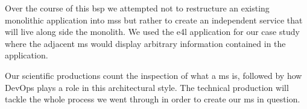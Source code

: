 Over the course of this \gls{bsp} we attempted not to restructure an
existing monolithic application into \glspl{ms} but rather to create
an independent service that will live along side the monolith. We used
the \gls{e4l} application for our case study where the adjacent
\gls{ms} would display arbitrary information contained in the
application.

Our scientific productions count the inspection of what a \gls{ms} is,
followed by how DevOps plays a role in this architectural style. The
technical production will tackle the whole process we went through in
order to create our \gls{ms} in question.




